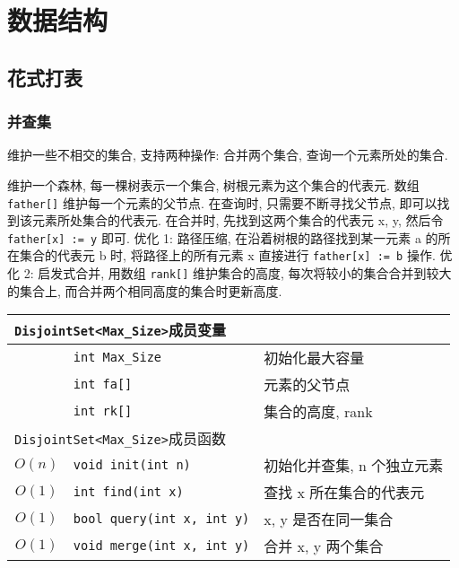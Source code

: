 \chapter{数据结构}

% 
\section{花式打表}\small


	\subsection{并查集}\small
维护一些不相交的集合, 支持两种操作: 合并两个集合, 查询一个元素所处的集合.

维护一个森林, 每一棵树表示一个集合, 树根元素为这个集合的代表元. 数组
{\tt father[]} 维护每一个元素的父节点. 在查询时, 只需要不断寻找父节点, 即可以找
到该元素所处集合的代表元. 在合并时, 先找到这两个集合的代表元 x, y, 然后令
{\tt father[x] := y} 即可. 优化 1: 路径压缩, 在沿着树根的路径找到某一元素 a 的所
在集合的代表元 b 时, 将路径上的所有元素 x 直接进行 {\tt father[x] := b} 操作. 优
化 2: 启发式合并, 用数组 {\tt rank[]} 维护集合的高度, 每次将较小的集合合并到较大
的集合上, 而合并两个相同高度的集合时更新高度.

\begin{longtable}{c|l|l} \hline\hline
\multicolumn{3}{l}{{\tt DisjointSet<Max\_Size>}成员变量} \\ \hline
& \verb`int Max_Size` & 初始化最大容量 \\
& \verb`int fa[]` & 元素的父节点 \\
& \verb`int rk[]` & 集合的高度, rank \\
\hline
\multicolumn{3}{l}{{\tt DisjointSet<Max\_Size>}成员函数} \\ \hline
$O(n)$ & \verb`void init(int n)` & 初始化并查集, n 个独立元素 \\
$O(1)$ & \verb`int find(int x)` & 查找 x 所在集合的代表元 \\
$O(1)$ & \verb`bool query(int x, int y)` & x, y 是否在同一集合 \\
$O(1)$ & \verb`void merge(int x, int y)` & 合并 x, y 两个集合 \\
\hline\hline
\end{longtable}



